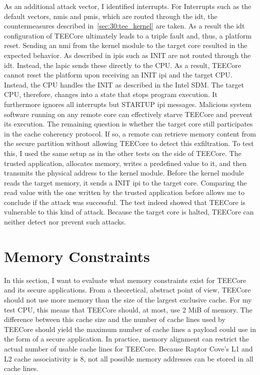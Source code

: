 As an additional attack vector, I identified interrupts. For Interrupts such as
the default vectors, \glspl{nmi} and \glspl{pmi}, which are routed through the
\gls{idt}, the countermeasures described in~\ref{sec:30:tee_kernel} are taken.
As a result the \gls{idt} configuration of TEECore ultimately leads to a triple
fault and, thus, a platform reset. Sending an \gls{nmi} from the kernel module
to the target core resulted in the expected behavior. As described in
 \glspl{ipi} such as INIT are not routed through the \gls{idt}.
Instead, the \gls{lapic} sends these directly to the CPU. As a result, TEECore
cannot reset the platform upon receiving an INIT \gls{ipi} and the target CPU.
Instead, the CPU handles the INIT as described in the Intel SDM. The target CPU,
therefore, changes into a state that stops program execution. It furthermore
ignores all interrupts but STARTUP \gls{ipi} messages. Malicious system software
running on any remote core can effectively starve TEECore and prevent its
execution. The remaining question is whether the target core still participates
in the cache coherency protocol. If so, a remote can retrieve memory content
from the secure partition without allowing TEECore to detect this exfiltration.
To test this, I used the same setup as in the other tests on the side of
TEECore. The trusted application, allocates memory, writes a predefined value to
it, and then transmits the physical address to the kernel module. Before the
kernel module reads the target memory, it sends a INIT \gls{ipi} to the target
core. Comparing the read value with the one written by the trusted application
before allows me to conclude if the attack was successful. The test indeed
showed that TEECore is vulnerable to this kind of attack. Because the target
core is halted, TEECore can neither detect nor prevent such attacks.

\section{Memory Constraints}
\label{eval:mem_constraints}
In this section, I want to evaluate what memory constraints exist for TEECore
and its secure applications. From a theoretical, abstract point of view, TEECore
should not use more memory than the size of the largest exclusive cache. For my
test CPU, this means that TEECore should, at most, use 2 MiB of memory. The
difference between this cache size and the number of cache lines used by TEECore
should yield the maximum number of cache lines a payload could use in the form
of a secure application. In practice, memory alignment can restrict the actual
number of usable cache lines for TEECore. Because Raptor Cove's L1 and L2 cache
associativity is 8, not all possible memory addresses can be stored in all cache
lines.\\

